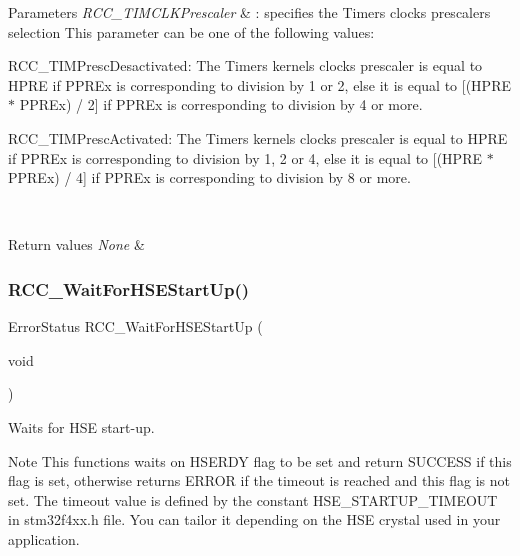 \begin{DoxyParams}{Parameters}
{\em R\+C\+C\+\_\+\+T\+I\+M\+C\+L\+K\+Prescaler} & \+: specifies the Timers clocks prescalers selection This parameter can be one of the following values\+: \begin{DoxyItemize}
\item R\+C\+C\+\_\+\+T\+I\+M\+Presc\+Desactivated\+: The Timers kernels clocks prescaler is equal to H\+P\+RE if P\+P\+R\+Ex is corresponding to division by 1 or 2, else it is equal to \mbox{[}(H\+P\+RE $\ast$ P\+P\+R\+Ex) / 2\mbox{]} if P\+P\+R\+Ex is corresponding to division by 4 or more.\end{DoxyItemize}
\begin{DoxyItemize}
\item R\+C\+C\+\_\+\+T\+I\+M\+Presc\+Activated\+: The Timers kernels clocks prescaler is equal to H\+P\+RE if P\+P\+R\+Ex is corresponding to division by 1, 2 or 4, else it is equal to \mbox{[}(H\+P\+RE $\ast$ P\+P\+R\+Ex) / 4\mbox{]} if P\+P\+R\+Ex is corresponding to division by 8 or more. \end{DoxyItemize}
\\
\hline
\end{DoxyParams}

\begin{DoxyRetVals}{Return values}
{\em None} & \\
\hline
\end{DoxyRetVals}
\mbox{\label{group___r_c_c_gae0f15692614dd048ee4110a056f001dc}} 
\subsubsection{\texorpdfstring{R\+C\+C\+\_\+\+Wait\+For\+H\+S\+E\+Start\+Up()}{RCC\_WaitForHSEStartUp()}}
{\footnotesize\ttfamily Error\+Status R\+C\+C\+\_\+\+Wait\+For\+H\+S\+E\+Start\+Up (\begin{DoxyParamCaption}\item[{void}]{ }\end{DoxyParamCaption})}



Waits for H\+SE start-\/up. 

\begin{DoxyNote}{Note}
This functions waits on H\+S\+E\+R\+DY flag to be set and return S\+U\+C\+C\+E\+SS if this flag is set, otherwise returns E\+R\+R\+OR if the timeout is reached and this flag is not set. The timeout value is defined by the constant H\+S\+E\+\_\+\+S\+T\+A\+R\+T\+U\+P\+\_\+\+T\+I\+M\+E\+O\+UT in stm32f4xx.\+h file. You can tailor it depending on the H\+SE crystal used in your application. 
\end{DoxyNote}


